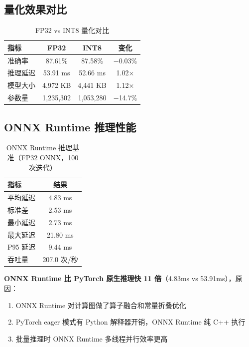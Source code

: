 \documentclass[12pt,a4paper]{ctexart}
\begin{document}
\subsection{量化效果对比}

\begin{table}[h]
\centering
\begin{tabular}{@{}lccc@{}}
\toprule
\textbf{指标} & \textbf{FP32} & \textbf{INT8} & \textbf{变化} \\
\midrule
准确率      & 87.61\%      & 87.58\%       & $-$0.03\% \\
推理延迟     & 53.91 ms     & 52.66 ms      & 1.02× \\
模型大小     & 4,972 KB     & 4,441 KB      & 1.12× \\
参数量       & 1,235,302    & 1,053,280     & $-$14.7\% \\
\bottomrule
\end{tabular}
\caption{FP32 vs INT8 量化对比}
\end{table}

\subsection{ONNX Runtime 推理性能}

\begin{table}[h]
\centering
\begin{tabular}{@{}lc@{}}
\toprule
\textbf{指标} & \textbf{结果} \\
\midrule
平均延迟   & 4.83 ms \\
标准差     & 2.53 ms \\
最小延迟   & 2.73 ms \\
最大延迟   & 21.80 ms \\
P95 延迟   & 9.44 ms \\
吞吐量     & 207.0 次/秒 \\
\bottomrule
\end{tabular}
\caption{ONNX Runtime 推理基准（FP32 ONNX，100 次迭代）}
\end{table}

\textbf{ONNX Runtime 比 PyTorch 原生推理快 11 倍}（4.83ms vs 53.91ms），原因：
\begin{enumerate}
    \item ONNX Runtime 对计算图做了算子融合和常量折叠优化
    \item PyTorch eager 模式有 Python 解释器开销，ONNX Runtime 纯 C++ 执行
    \item 批量推理时 ONNX Runtime 多线程并行效率更高
\end{enumerate}
\end{document}
